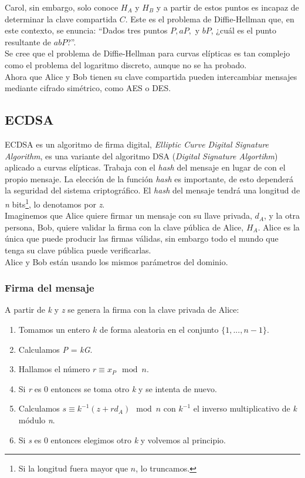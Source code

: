 \documentclass[11pt]{article}
\begin{document}
Carol, sin embargo, solo conoce $H_A$ y $H_B$ y a partir de estos puntos es incapaz de determinar la clave compartida $C$. Este es el problema de Diffie-Hellman que, en este contexto, se enuncia:
  ``Dados tres puntos $P, aP,$ y $bP$, ¿cuál es el punto resultante de $abP$?''.\\

Se cree que el problema de Diffie-Hellman para curvas elípticas es tan complejo como el problema del logaritmo discreto, aunque no se ha probado.\\

Ahora que Alice y Bob tienen su clave compartida pueden intercambiar mensajes mediante cifrado simétrico, como AES o DES.

\subsection{ECDSA}

ECDSA es un algoritmo de firma digital, \textit{Elliptic Curve Digital Signature Algorithm}, es una variante del algoritmo DSA (\textit{Digital Signature Algortihm}) aplicado a curvas elípticas. Trabaja con el \textit{hash} del mensaje en lugar de con el propio mensaje. La elección de la función \textit{hash} es importante, de esto dependerá la seguridad del sistema criptográfico. El \textit{hash} del mensaje tendrá una longitud de \textit{n} bits\footnote{Si la longitud fuera mayor que $n$, lo truncamos.}, lo denotamos por \textit{z}.\\

Imaginemos que Alice quiere firmar un mensaje con su llave privada, $d_{A}$, y la otra persona, Bob, quiere validar la firma con la clave pública de Alice, $H_{A}$. Alice es la única que puede producir las firmas válidas, sin embargo todo el mundo que tenga su clave pública puede verificarlas.\\

Alice y Bob están usando los mismos parámetros del dominio.

\subsubsection*{Firma del mensaje}
A partir de \textit{k} y \textit{z} se genera la firma con la clave privada de Alice:

\begin{enumerate}
	\item Tomamos un entero $ k $ de forma aleatoria en el conjunto $ \{ 1, ..., n-1\} $.
	\item Calculamos \textit{P} = \textit{kG}.
	\item Hallamos el número \textit{$r \equiv x_{P} \mod n$}.
	\item Si \textit{r} es 0 entonces se toma otro \textit{k} y se intenta de nuevo.
	\item Calculamos $s \equiv k^{-1}(z + rd_{A}) \mod n$  con \textit{$k^{-1}$} el inverso multiplicativo de \textit{k} módulo \textit{n}.
	\item Si \textit{s} es 0 entonces elegimos otro \textit{k} y volvemos al principio.
\end{enumerate} 
\end{document}
